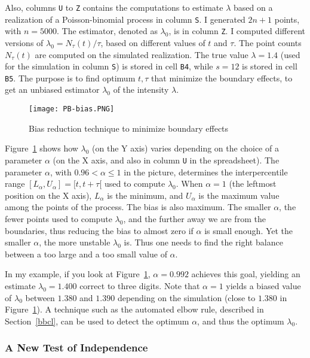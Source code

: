 \documentclass[10pt]{article}
\begin{document}
Also, columns \texttt{U} to \texttt{Z} contains the computations to estimate $\lambda$ based on a realization of a Poisson-binomial process in column \texttt{S}. I generated $2n+1$ points, with $n=\num{5000}$.
The estimator, 
 denoted as $\lambda_0$, is in column \texttt{Z}. I computed different versions of $\lambda_0=N_\tau(t)/\tau$, based on different values of $t$ and $\tau$. The point counts 
 $N_\tau(t)$ are computed on the simulated realization. The true value $\lambda=1.4$ (used for the simulation in column \texttt{S}) is stored in cell \texttt{B4}, while $s=12$ is stored in cell \texttt{B5}. The purpose is to find optimum $t,\tau$ that minimize the boundary effects, to get an unbiased estimator $\lambda_0$ of the intensity $\lambda$. 

\begin{figure}[H]
\centering
\texttt{[image: PB-bias.PNG]}
\caption{Bias reduction technique to minimize boundary effects}
\label{fig:pbbias}
\end{figure}

Figure~\ref{fig:pbbias} shows how $\lambda_0$ (on the Y axis) varies depending on the choice of a parameter $\alpha$ (on the X axis, and also in column \texttt{U} in the spreadsheet). The parameter 
$\alpha$, with $0.96<\alpha\leq 1$ in the picture, 
determines the interpercentile range $[L_\alpha,U_\alpha] = [t, t+\tau[$ used to compute $\lambda_0$. When $\alpha=1$ (the leftmost position on the X axis), 
 $L_\alpha$ is the minimum, and $U_\alpha$ is the maximum value among the points of the process. The bias is also maximum. The smaller $\alpha$, the fewer points used to compute $\lambda_0$, and the further away we are from the boundaries, thus reducing the bias to almost zero if $\alpha$ is small enough. Yet the smaller $\alpha$, the more unstable $\lambda_0$ is. Thus one needs to find the right balance between a too large and a too small value of $\alpha$. 

In my example, if you look at Figure~\ref{fig:pbbias}, $\alpha=0.992$ achieves this goal, yielding an estimate $\lambda_0=1.400$ correct to three digits. Note that $\alpha=1$ yields a biased value of $\lambda_0$ between $1.380$ and $1.390$ depending on the simulation 
 (close to $1.380$ in Figure~\ref{fig:pbbias}). A technique such as the automated \textcolor{index}{elbow rule}, described in Section~\ref{bbcl}, can be used to detect the optimum $\alpha$, and thus the optimum $\lambda_0$.


\subsubsection{A New Test of Independence}\label{indep1}
\end{document}
